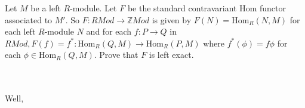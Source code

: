 Let $M$ be a left $R$-module. Let $F$ be the standard contravariant Hom functor associated to $M'$. So
$F:RMod\to \mathbb{Z}Mod$ is given by $F(N)=\text{Hom}_R(N,M)$ for each left $R$-module $N$ and for each
$f:P\to Q$ in $RMod, F(f)=f^*:\text{Hom}_R(Q,M)\to\text{Hom}_R(P,M)$ where $f^*(\phi)=f\phi$ for each
$\phi\in\text{Hom}_R(Q,M)$. Prove that $F$ is left exact.\\\\

\begin{solution}\renewcommand{\qedsymbol}{}\ \\
    Well,
\end{solution}